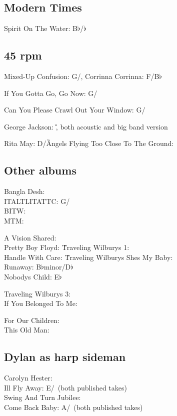\subsection{Modern Times}

Spirit On The Water: B$\flat$/\E$\flat$


\subsection*{45 rpm}

Mixed-Up Confusion: G/\C, Corrinna Corrinna: F/B$\flat$


If You Gotta Go, Go Now: G/\C


Can You Please Crawl Out Your Window: G/\C


George Jackson: \G, both acoustic and big band version


Rita May: D/\G


Angels Flying Too Close To The Ground: \A

\subsection*{Other albums}


Bangla Desh: \\ ITALTLITATTC: G/\C\\ BITW: \G\\ MTM: \E


A Vision Shared: \\ Pretty Boy Floyd: \G


Traveling Wilburys 1: \\ Handle With Care: \G


Traveling Wilburys Shes My Baby: \\ Runaway: B$\flat$minor/D$\flat$\\ Nobodys
Child: E$\flat$


Traveling Wilburys 3: \\ If You Belonged To Me: \D


For Our Children: \\ This Old Man: \C


\subsection{Dylan as harp sideman}

Carolyn Hester: \\ Ill Fly Away: E/\A\ (both published takes)\\ Swing
And Turn Jubilee: \G\\ Come Back Baby: A/\D\ (both published takes)


